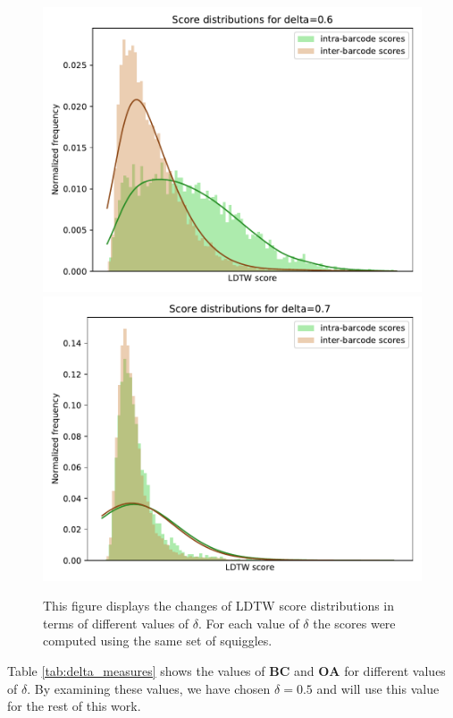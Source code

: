\begin{figure}[!ht]
\includegraphics[scale=0.5]{images/delta/delta_raw_60.pdf}
\includegraphics[scale=0.5]{images/delta/delta_raw_70.pdf}

\caption[Score distributions for different values of $\delta$]{This figure displays the changes of LDTW score distributions in terms of different values of $\delta$. For each value of $\delta$ the scores were computed using the same set of squiggles.} \label{fig:deltas_collage}
\end{figure}

Table \ref{tab:delta_measures} shows the values of  $\textbf{BC}$ and $\textbf{OA}$ for different values of $\delta$. By examining these values, we have chosen $\delta = 0.5$ and will use this value for the rest of this work.

